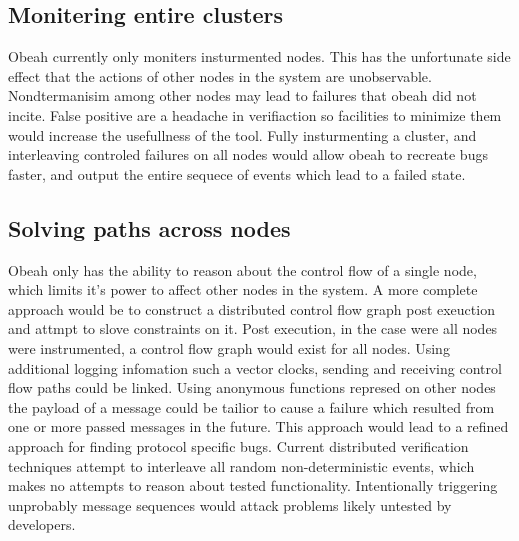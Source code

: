\subsection{Monitering entire clusters}

Obeah currently only moniters insturmented nodes. This has the unfortunate side
effect that the actions of other nodes in the system are unobservable.
Nondtermanisim among other nodes may lead to failures that obeah did not
incite. False positive are a headache in verifiaction so facilities to minimize
them would increase the usefullness of the tool. Fully insturmenting a cluster,
and interleaving controled failures on all nodes would allow obeah to recreate
bugs faster, and output the entire sequece of events which lead to a failed
state.

\subsection{Solving paths across nodes}

Obeah only has the ability to reason about the control flow of a single node,
which limits it's power to affect other nodes in the system. A more complete
approach would be to construct a distributed control flow graph post exeuction
and attmpt to slove constraints on it. Post execution, in the case were all
nodes were instrumented, a control flow graph would exist for all nodes. Using
additional logging infomation such a vector clocks, sending and receiving
control flow paths could be linked. Using anonymous functions represed on other
nodes the payload of a message could be tailior to cause a failure which
resulted from one or more passed messages in the future. This approach would
lead to a refined approach for finding protocol specific bugs. Current
distributed verification techniques attempt to interleave all random
non-deterministic events, which makes no attempts to reason about tested
functionality. Intentionally triggering unprobably message sequences would
attack problems likely untested by developers.

